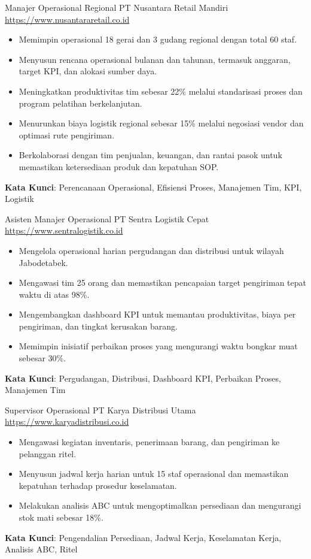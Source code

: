 \documentclass[a4paper, serif, 10pt]{moderncv}
\begin{document}
        {Manajer Operasional Regional}
        {PT Nusantara Retail Mandiri}
        {\url{https://www.nusantararetail.co.id}}
        {}
        {\begin{itemize}
\item Memimpin operasional 18 gerai dan 3 gudang regional dengan total 60 staf.
\item Menyusun rencana operasional bulanan dan tahunan, termasuk anggaran, target KPI, dan alokasi sumber daya.
\item Meningkatkan produktivitas tim sebesar 22\% melalui standarisasi proses dan program pelatihan berkelanjutan.
\item Menurunkan biaya logistik regional sebesar 15\% melalui negosiasi vendor dan optimasi rute pengiriman.
\item Berkolaborasi dengan tim penjualan, keuangan, dan rantai pasok untuk memastikan ketersediaan produk dan kepatuhan SOP.
\end{itemize}
\textbf{Kata Kunci}: Perencanaan Operasional, Efisiensi Proses, Manajemen Tim, KPI, Logistik}

        {Asisten Manajer Operasional}
        {PT Sentra Logistik Cepat}
        {\url{https://www.sentralogistik.co.id}}
        {}
        {\begin{itemize}
\item Mengelola operasional harian pergudangan dan distribusi untuk wilayah Jabodetabek.
\item Mengawasi tim 25 orang dan memastikan pencapaian target pengiriman tepat waktu di atas 98\%.
\item Mengembangkan dashboard KPI untuk memantau produktivitas, biaya per pengiriman, dan tingkat kerusakan barang.
\item Memimpin inisiatif perbaikan proses yang mengurangi waktu bongkar muat sebesar 30\%.
\end{itemize}
\textbf{Kata Kunci}: Pergudangan, Distribusi, Dashboard KPI, Perbaikan Proses, Manajemen Tim}

        {Supervisor Operasional}
        {PT Karya Distribusi Utama}
        {\url{https://www.karyadistribusi.co.id}}
        {}
        {\begin{itemize}
\item Mengawasi kegiatan inventaris, penerimaan barang, dan pengiriman ke pelanggan ritel.
\item Menyusun jadwal kerja harian untuk 15 staf operasional dan memastikan kepatuhan terhadap prosedur keselamatan.
\item Melakukan analisis ABC untuk mengoptimalkan persediaan dan mengurangi stok mati sebesar 18\%.
\end{itemize}
\textbf{Kata Kunci}: Pengendalian Persediaan, Jadwal Kerja, Keselamatan Kerja, Analisis ABC, Ritel}
\end{document}
